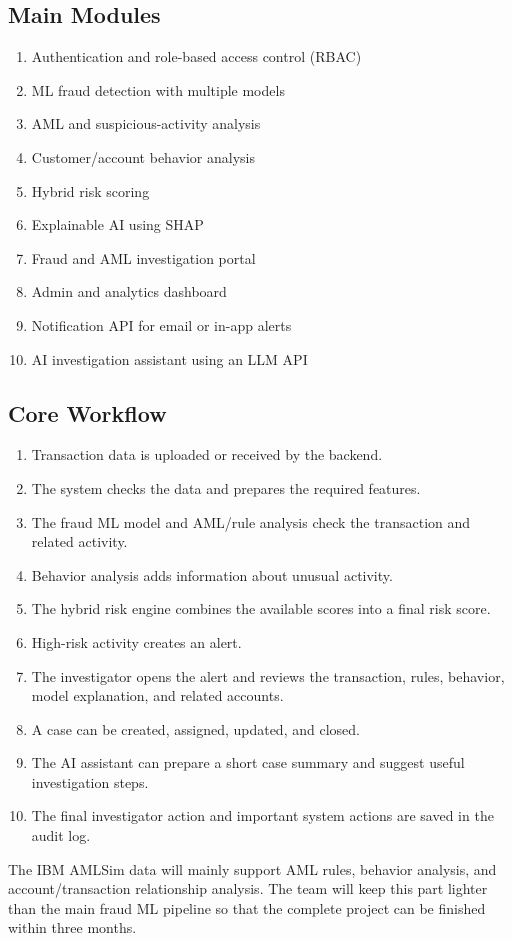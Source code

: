 \documentclass[11pt,a4paper]{article}
\begin{document}
\subsection{Main Modules}
\begin{enumerate}
    \item Authentication and role-based access control (RBAC)
    \item ML fraud detection with multiple models
    \item AML and suspicious-activity analysis
    \item Customer/account behavior analysis
    \item Hybrid risk scoring
    \item Explainable AI using SHAP
    \item Fraud and AML investigation portal
    \item Admin and analytics dashboard
    \item Notification API for email or in-app alerts
    \item AI investigation assistant using an LLM API
\end{enumerate}

\subsection{Core Workflow}
\begin{enumerate}
    \item Transaction data is uploaded or received by the backend.
    \item The system checks the data and prepares the required features.
    \item The fraud ML model and AML/rule analysis check the transaction and related activity.
    \item Behavior analysis adds information about unusual activity.
    \item The hybrid risk engine combines the available scores into a final risk score.
    \item High-risk activity creates an alert.
    \item The investigator opens the alert and reviews the transaction, rules, behavior, model explanation, and related accounts.
    \item A case can be created, assigned, updated, and closed.
    \item The AI assistant can prepare a short case summary and suggest useful investigation
steps.
    \item The final investigator action and important system actions are saved in the audit log.
\end{enumerate}
The IBM AMLSim data will mainly support AML rules, behavior analysis, and account/transaction relationship analysis. The team will keep this part lighter than the
main fraud ML pipeline so that the complete project can be finished within three months.
\end{document}
